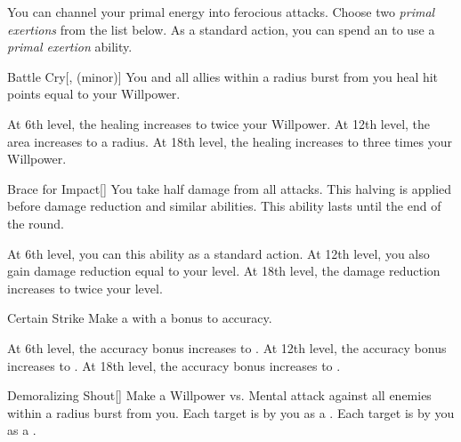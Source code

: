         You can channel your primal energy into ferocious attacks.
        Choose two \textit{primal exertions} from the list below.
        As a standard action, you can spend an  to use a \textit{primal exertion} ability.
        {
            \begin{ability}{Battle Cry}[,  (minor)]
                You and all allies within a \arealarge radius burst from you heal hit points equal to your Willpower.

                At 6th level, the healing increases to twice your Willpower.
                At 12th level, the area increases to a \areahuge radius.
                At 18th level, the healing increases to three times your Willpower.
            \end{ability}

            \begin{ability}{Brace for Impact}[]
                You take half damage from all attacks.
                This halving is applied before damage reduction and similar abilities.
                This ability lasts until the end of the round.

                At 6th level, you can  this ability as a standard action.
                At 12th level, you also gain damage reduction equal to your level.
                At 18th level, the damage reduction increases to twice your level.
            \end{ability}

            \begin{ability}{Certain Strike}
                Make a  with a  bonus to accuracy.

                At 6th level, the accuracy bonus increases to .
                At 12th level, the accuracy bonus increases to .
                At 18th level, the accuracy bonus increases to .
            \end{ability}

            \begin{ability}{Demoralizing Shout}[]
                Make a Willpower vs. Mental attack against all enemies within a \arealarge radius burst from you.
                \hit Each target is  by you as a .
                \crit Each target is  by you as a .


\end{ability}}
